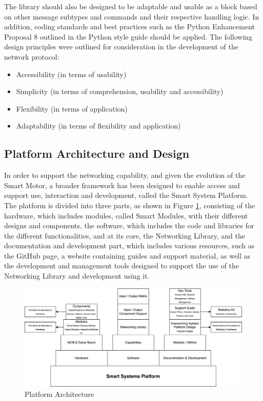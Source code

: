 The library should also be designed to be adaptable and usable as a block based on other message subtypes and commands and their respective handling logic.
In addition, coding standards and best practices such as the Python Enhancement Proposal 8 outlined in the Python style guide \citep{rossum_python_2001} should be applied. The following design principles were outlined for consideration in the development of the network protocol:
\begin{itemize}
    \item Accessibility (in terms of usability)
    \item Simplicity (in terms of comprehension, usability and accessibility)
    \item Flexibility (in terms of application)
    \item Adaptability (in terms of flexibility and application)
\end{itemize}
\newpage
\subsection{\label{sec:methods_ssp_des}Platform Architecture and Design}

In order to support the networking capability, and given the evolution of the Smart Motor, a broader framework has been designed to enable access and support use, interaction and development, called the Smart System Platform. \\

The platform is divided into three parts, as shown in Figure \ref{fig:met:ssp_architecture}, consisting of the hardware, which includes modules, called Smart Modules, with their different designs and components, the software, which includes the code and libraries for the different functionalities, and at its core, the Networking Library, and the documentation and development part, which includes various resources, such as the GitHub page, a website containing guides and support material, as well as the development and management tools designed to support the use of the Networking Library and development using it.

\begin{figure}[H]
    \centering
    \includegraphics[width=\linewidth]{overleaf/images/Smart Systems Platform.drawio.png}
    \vspace{\ftspace}
    \caption{Platform Architecture}
    \label{fig:met:ssp_architecture}
\end{figure}

